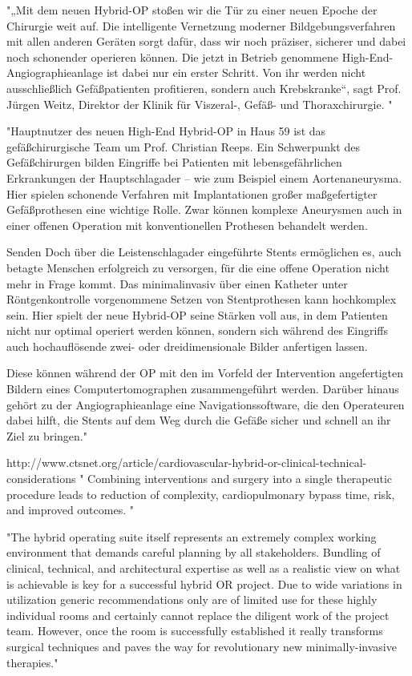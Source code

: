 	"„Mit dem neuen Hybrid-OP stoßen wir die Tür zu einer neuen Epoche der Chirurgie weit auf. Die intelligente Vernetzung moderner Bildgebungsverfahren mit allen anderen Geräten sorgt dafür, dass wir noch präziser, sicherer und dabei noch schonender operieren können. Die jetzt in Betrieb genommene High-End-Angiographieanlage ist dabei nur ein erster Schritt. Von ihr werden nicht ausschließlich Gefäßpatienten profitieren, sondern auch Krebskranke“, sagt Prof. Jürgen Weitz, Direktor der Klinik für Viszeral-, Gefäß- und Thoraxchirurgie. "
	
	"Hauptnutzer des neuen High-End Hybrid-OP in Haus 59 ist das gefäßchirurgische Team um Prof. Christian Reeps. Ein Schwerpunkt des Gefäßchirurgen bilden Eingriffe bei Patienten mit lebensgefährlichen Erkrankungen der Hauptschlagader – wie zum Beispiel einem Aortenaneurysma. Hier spielen schonende Verfahren mit Implantationen großer maßgefertigter Gefäßprothesen eine wichtige Rolle. Zwar können komplexe Aneurysmen auch in einer offenen Operation mit konventionellen Prothesen behandelt werden.
	
	Senden	
	Doch über die Leistenschlagader eingeführte Stents ermöglichen es, auch betagte Menschen erfolgreich zu versorgen, für die eine offene Operation nicht mehr in Frage kommt. Das minimalinvasiv über einen Katheter unter Röntgenkontrolle vorgenommene Setzen von Stentprothesen kann hochkomplex sein. Hier spielt der neue Hybrid-OP seine Stärken voll aus, in dem Patienten nicht nur optimal operiert werden können, sondern sich während des Eingriffs auch hochauflösende zwei- oder dreidimensionale Bilder anfertigen lassen.
	
	Diese können während der OP mit den im Vorfeld der Intervention angefertigten Bildern eines Computertomographen zusammengeführt werden. Darüber hinaus gehört zu der Angiographieanlage eine Navigationssoftware, die den Operateuren dabei hilft, die Stents auf dem Weg durch die Gefäße sicher und schnell an ihr Ziel zu bringen."

http://www.ctsnet.org/article/cardiovascular-hybrid-or-clinical-technical-considerations	
	" Combining interventions and surgery into a single therapeutic procedure leads to reduction of complexity, cardiopulmonary bypass time, risk, and improved outcomes. "
	
	"The hybrid operating suite itself represents an extremely complex working environment that demands careful planning by all stakeholders. Bundling of clinical, technical, and architectural expertise as well as a realistic view on what is achievable is key for a successful hybrid OR project. Due to wide variations in utilization generic recommendations only are of limited use for these highly individual rooms and certainly cannot replace the diligent work of the project team. However, once the room is successfully established it really transforms surgical techniques and paves the way for revolutionary new minimally-invasive therapies."

